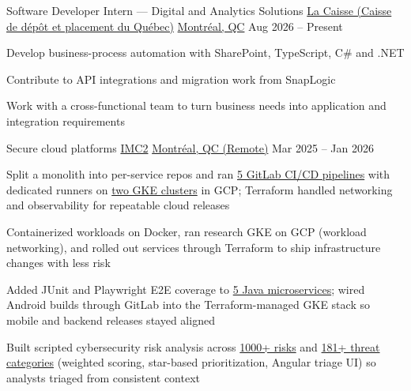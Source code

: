 
\begin{cventries}

\cventry
{Software Developer Intern --- Digital and Analytics Solutions} %
{\href{https://www.lacaisse.com/}{La Caisse (Caisse de dépôt et placement du Québec)}} %
{\href{https://www.google.com/maps/search/?api=1\&query=Montreal,+QC,+Canada}{Montréal, QC}} %
{Aug 2026 -- Present} %
{\begin{cvitems}
\item {Develop business-process automation with SharePoint, TypeScript, C\# and .NET}
\item {Contribute to API integrations and migration work from SnapLogic}
\item {Work with a cross-functional team to turn business needs into application and integration requirements}
\end{cvitems}}

\cventry
{Secure cloud platforms} %
{\href{https://i-mc2.ca/en/}{IMC2}} %
{\href{https://www.google.com/maps/search/?api=1\&query=Montreal,+QC,+Canada}{Montréal, QC (Remote)}} %
{Mar 2025 -- Jan 2026} %
{
\begin{cvitems}
\item {Split a monolith into per-service repos and ran \uline{5 GitLab CI/CD pipelines} with dedicated runners on \uline{two GKE clusters} in GCP; Terraform handled networking and \mbox{observability} for repeatable cloud releases}
\item {Containerized workloads on Docker, ran research GKE on GCP (workload networking), and rolled out services through Terraform to ship infrastructure changes with less risk}
\item {Added JUnit and Playwright E2E coverage to \uline{5 Java microservices}; wired Android builds through GitLab into the Terraform-managed GKE stack so mobile and backend releases stayed aligned}
\item {Built scripted cybersecurity risk analysis across \uline{1000+ risks} and \uline{181+ threat categories} (weighted scoring, star-based prioritization, Angular triage UI) so analysts triaged from consistent context}
\end{cvitems}
}


\end{cventries}
